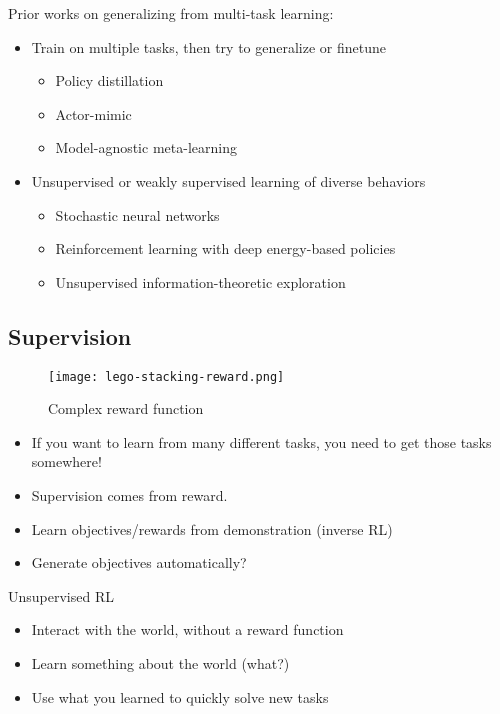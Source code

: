 Prior works on generalizing from multi-task learning:
\begin{itemize}
	\item Train on multiple tasks, then try to generalize or finetune
	\begin{itemize}
		\item Policy distillation \cite{rusu2015policy}
		\item Actor-mimic \cite{parisotto2015actor}
		\item Model-agnostic meta-learning \cite{finn2017model}
	\end{itemize}
	\item Unsupervised or weakly supervised learning of diverse behaviors
	\begin{itemize}
		\item Stochastic neural networks \cite{florensa2017stochastic}
		\item Reinforcement learning with deep energy-based policies \cite{haarnoja2017reinforcement}
		\item Unsupervised information-theoretic exploration
	\end{itemize}
\end{itemize}

\subsection{Supervision}
\begin{figure}[hbt!]
	\centering
	\texttt{[image: lego-stacking-reward.png]}
	\caption{Complex reward function \cite{popov2017data}}
	\label{fig:lego-stacking-reward}
\end{figure}

\begin{itemize}
	\item If you want to learn from many different tasks, you need to get those tasks somewhere!
	\item Supervision comes from reward.
	\item Learn objectives/rewards from demonstration (inverse \ac{RL})
	\item Generate objectives automatically?
\end{itemize}

Unsupervised \ac{RL}
\begin{itemize}
	\item Interact with the world, without a reward function
	\item Learn something about the world (what?)
	\item Use what you learned to quickly solve new tasks
\end{itemize}